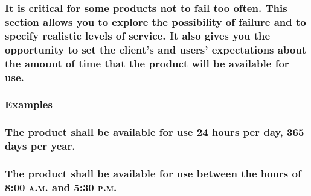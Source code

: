 \documentclass[
]{article}
\begin{document}
\hypertarget{it-is-critical-for-some-products-not-to-fail-too-often.-this-section-allows-you-to-explore-the-possibility-of-failure-and-to-specify-realistic-levels-of-service.-it-also-gives-you-the-opportunity-to-set-the-clients-and-users-expectations-about-the-amount-of-time-that-the-product-will-be-available-for-use.}{%
\subsubsection{\texorpdfstring{It is critical for some products not to
fail too often. This section allows you to explore the possibility of
failure and to specify realistic levels of service. It also gives you
the opportunity to set the client's and users' expectations about the
amount of time that the product will be available for use.
}{It is critical for some products not to fail too often. This section allows you to explore the possibility of failure and to specify realistic levels of service. It also gives you the opportunity to set the client's and users' expectations about the amount of time that the product will be available for use. }}\label{it-is-critical-for-some-products-not-to-fail-too-often.-this-section-allows-you-to-explore-the-possibility-of-failure-and-to-specify-realistic-levels-of-service.-it-also-gives-you-the-opportunity-to-set-the-clients-and-users-expectations-about-the-amount-of-time-that-the-product-will-be-available-for-use.}}

\hypertarget{examples-24}{%
\subsubsection{Examples}\label{examples-24}}

\hypertarget{the-product-shall-be-available-for-use-24-hours-per-day-365-days-per-year.}{%
\subsubsection{The product shall be available for use 24 hours per day,
365 days per
year.}\label{the-product-shall-be-available-for-use-24-hours-per-day-365-days-per-year.}}

\hypertarget{the-product-shall-be-available-for-use-between-the-hours-of-800-a.m.-and-530-p.m.}{%
\subsubsection{\texorpdfstring{The product shall be available for use
between the hours of 8:00 \textsc{a.m.} and 5:30
\textsc{p.m}.}{The product shall be available for use between the hours of 8:00 a.m. and 5:30 p.m.}}\label{the-product-shall-be-available-for-use-between-the-hours-of-800-a.m.-and-530-p.m.}}
\end{document}
